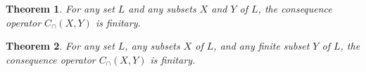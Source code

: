 \documentclass[12pt]{article}
\newtheorem{theorem}{Theorem}
\begin{document}
\begin{theorem}
For any set $L$ and any subsets $X$ and $Y$ of $L$, the consequence
operator $C_\cap (X,Y)$ is finitary.
\end{theorem}

\begin{theorem}
For any set $L$, any subsets $X$ of $L$, and any \emph{finite} subset $Y$
of $L$, the consequence operator $C_\cap (X,Y)$ is finitary.
\end{theorem}
\end{document}
